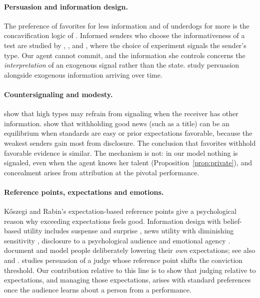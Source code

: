 \documentclass[11pt]{article}
\theoremstyle{definition}
\begin{document}
\paragraph{Persuasion and information design.} The preference of favorites for less information and of underdogs for more is the concavification logic of \citet{KamenicaGentzkow2011}. Informed senders who choose the informativeness of a test are studied by \citet{PerezRichet2014}, \citet{Hedlund2017}, \citet{DeganLi2021} and \citet{KoesslerSkreta2023}, where the choice of experiment signals the sender's type. Our agent cannot commit, and the information she controls concerns the \emph{interpretation} of an exogenous signal rather than the state. \citet{BizzottoRudigerVigier2021} study persuasion alongside exogenous information arriving over time.

\paragraph{Countersignaling and modesty.} \citet{FeltovichHarbaughTo2002} show that high types may refrain from signaling when the receiver has other information. \citet{HarbaughTo2020} show that withholding good news (such as a title) can be an equilibrium when standards are easy or prior expectations favorable, because the weakest senders gain most from disclosure. The conclusion that favorites withhold favorable evidence is similar. The mechanism is not: in our model nothing is signaled, even when the agent knows her talent (Proposition~\ref{prop:private}), and concealment arises from attribution at the pivotal performance.

\paragraph{Reference points, expectations and emotions.} Kőszegi and Rabin's expectation-based reference points \citeyearpar{KoszegiRabin2006,KoszegiRabin2009} give a psychological reason why exceeding expectations feels good. Information design with belief-based utility includes suspense and surprise \citep{ElyFrankelKamenica2015}, news utility with diminishing sensitivity \citep{DurajHe2024}, disclosure to a psychological audience \citep{LipnowskiMathevet2018} and emotional agency \citep{Koszegi2006}. \citet{ZeckhauserViscusi2025} document and model people deliberately lowering their \emph{own} expectations; see also \citet{GollierMuermann2010} and \citet{BrunnermeierParker2005}. \citet{Robertson2025} studies persuasion of a judge whose reference point shifts the conviction threshold. Our contribution relative to this line is to show that judging relative to expectations, and managing those expectations, arises with standard preferences once the audience learns about a person from a performance.
\end{document}
